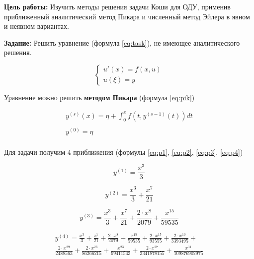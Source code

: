 \textbf{Цель работы:} Изучить методы решения задачи Коши для ОДУ,
применив приближенный аналитический метод Пикара и численный метод
Эйлера в явном и неявном вариантах.

\textbf{Задание:} Решить уравнение (формула \ref{eq:task}),
не имеющее аналитического решения.

\begin{equation}\label{eq:task}
    \begin{cases}
        u'(x) = f(x,u) \\
        u(\xi) = y
    \end{cases}
\end{equation}

Уравнение можно решить \textbf{методом Пикара} (формула \ref{eq:pik})

\begin{equation}\label{eq:pik}
    \begin{matrix}
        y^{(s)}(x) = \eta + \int_0^x f(t, y^{(s-1)}(t)) dt \\
        \\
        y^{(0)} = \eta \\
    \end{matrix}
\end{equation}

Для задачи получим 4 приближения (формулы \ref{eq:p1}, \ref{eq:p2},
\ref{eq:p3}, \ref{eq:p4})

\begin{equation}\label{eq:p1}
    y^{(1)} = \frac{x^3}{3}
\end{equation}

\begin{equation}\label{eq:p2}
    y^{(2)} = \frac{x^3}{3} + \frac{x^7}{21}
\end{equation}

\begin{equation}\label{eq:p3}
    y^{(3)} = \frac{x^3}{3} + \frac{x^7}{21} + \frac{2 \cdot x^8}{2079}
    + \frac{x^{15}}{59535}
\end{equation}

\begin{multline}\label{eq:p4}
        y^{(4)} = \frac{x^3}{3} + \frac{x^7}{21} +
        \frac{2 \cdot x^8}{2079} +
        \frac{x^{15}}{59535} +
        \frac{2 \cdot x^{15}}{93555} +
        \frac{2 \cdot x^{19}}{3393495} + \\
        \frac{2 \cdot x^{29}}{2488563} +
        \frac{2 \cdot x^{23}}{86266215} +
        \frac{x^{23}}{99411543} +
        \frac{2 \cdot x^{27}}{3341878155} +
        \frac{x^{31}}{109876902975}
\end{multline}

